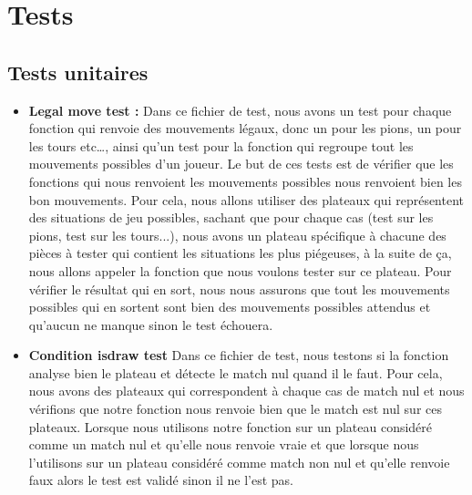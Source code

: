 \huge\documentclass{article}
\begin{document}
\medskip

\newpage
\section{Tests}
\subsection{Tests unitaires}

\begin{itemize}
    \item \textbf{Legal move test :} \newline
    Dans ce fichier de test, nous avons un test pour chaque fonction qui renvoie des mouvements légaux, donc un pour les pions, un pour les tours etc\dots , ainsi qu'un test pour la fonction qui regroupe tout les mouvements possibles d'un joueur.\newline
    Le but de ces tests est de vérifier que les fonctions qui nous renvoient les mouvements possibles nous renvoient bien les bon mouvements.\newline
    Pour cela, nous allons utiliser des plateaux qui représentent des situations de jeu possibles, sachant que pour chaque cas (test sur les pions, test sur les tours...), nous avons un plateau spécifique à chacune des pièces à tester qui contient les situations les plus piégeuses, à la suite de ça, nous allons appeler la fonction que nous voulons tester sur ce plateau.\newline
    Pour vérifier le résultat qui en sort, nous nous assurons que tout les mouvements possibles qui en sortent sont bien des mouvements possibles attendus et qu'aucun ne manque sinon le test échouera.\newline
    
    \item \textbf{Condition isdraw test}\newline
    Dans ce fichier de test, nous testons si la fonction analyse bien le plateau et détecte le match nul quand il le faut.\newline
    Pour cela, nous avons des plateaux qui correspondent à chaque cas de match nul et nous vérifions que notre fonction nous renvoie bien que le match est nul sur ces plateaux.\newline
    Lorsque nous utilisons notre fonction sur un plateau considéré comme un match nul et qu'elle nous renvoie vraie et que lorsque nous l'utilisons sur un plateau considéré comme match non nul et qu'elle renvoie faux alors le test est validé sinon il ne l'est pas.\newline
    

\end{itemize}
\end{document}
